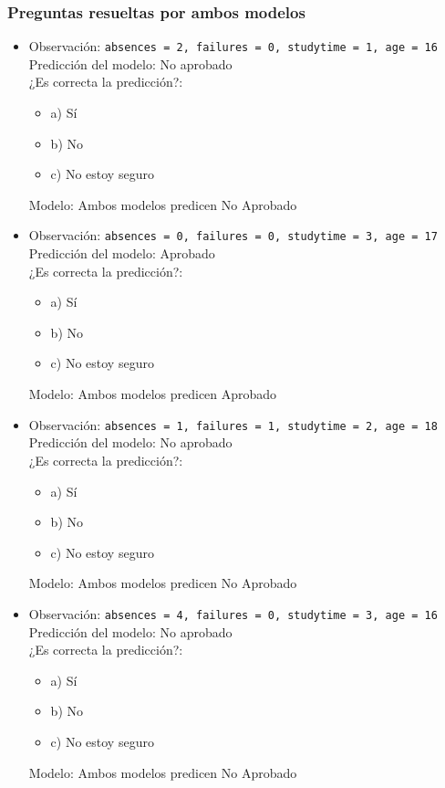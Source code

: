 \subsubsection*{Preguntas resueltas por ambos modelos}
\begin{itemize}
    \item Observación: \texttt{absences = 2, failures = 0, studytime = 1, age = 16}\\
    Predicción del modelo: No aprobado\\
    ¿Es correcta la predicción?:
    \begin{itemize}
        \item a) Sí
        \item b) No
        \item c) No estoy seguro
    \end{itemize}
    Modelo: Ambos modelos predicen No Aprobado

    \item Observación: \texttt{absences = 0, failures = 0, studytime = 3, age = 17}\\
    Predicción del modelo: Aprobado\\
    ¿Es correcta la predicción?:
    \begin{itemize}
        \item a) Sí
        \item b) No
        \item c) No estoy seguro
    \end{itemize}
    Modelo: Ambos modelos predicen Aprobado

    \item Observación: \texttt{absences = 1, failures = 1, studytime = 2, age = 18}\\
    Predicción del modelo: No aprobado\\
    ¿Es correcta la predicción?:
    \begin{itemize}
        \item a) Sí
        \item b) No
        \item c) No estoy seguro
    \end{itemize}
    Modelo: Ambos modelos predicen No Aprobado

    \item Observación: \texttt{absences = 4, failures = 0, studytime = 3, age = 16}\\
    Predicción del modelo: No aprobado\\
    ¿Es correcta la predicción?:
    \begin{itemize}
        \item a) Sí
        \item b) No
        \item c) No estoy seguro
    \end{itemize}
    Modelo: Ambos modelos predicen No Aprobado
\end{itemize}

